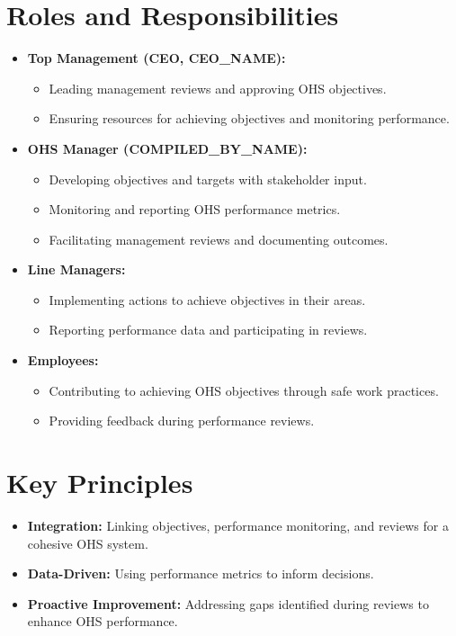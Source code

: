 \documentclass[12pt]{article}
\begin{document}
\section{Roles and Responsibilities}
\begin{itemize}
    \item \textbf{Top Management (CEO, {{CEO_NAME}}):}
    \begin{itemize}
        \item Leading management reviews and approving OHS objectives.
        \item Ensuring resources for achieving objectives and monitoring performance.
    \end{itemize}
    \item \textbf{OHS Manager ({{COMPILED_BY_NAME}}):}
    \begin{itemize}
        \item Developing objectives and targets with stakeholder input.
        \item Monitoring and reporting OHS performance metrics.
        \item Facilitating management reviews and documenting outcomes.
    \end{itemize}
    \item \textbf{Line Managers:}
    \begin{itemize}
        \item Implementing actions to achieve objectives in their areas.
        \item Reporting performance data and participating in reviews.
    \end{itemize}
    \item \textbf{Employees:}
    \begin{itemize}
        \item Contributing to achieving OHS objectives through safe work practices.
        \item Providing feedback during performance reviews.
    \end{itemize}
\end{itemize}

\section{Key Principles}
\begin{itemize}
    \item \textbf{Integration:} Linking objectives, performance monitoring, and reviews for a cohesive OHS system.
    \item \textbf{Data-Driven:} Using performance metrics to inform decisions.
    \item \textbf{Proactive Improvement:} Addressing gaps identified during reviews to enhance OHS performance.
\end{itemize}
\end{document}
